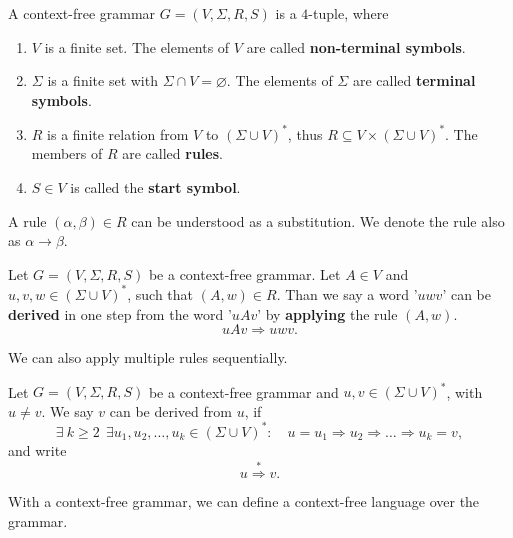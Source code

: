 \begin{definition}
A context-free grammar $G = (V, \Sigma, R, S)$ is a $4$-tuple, where
\begin{enumerate}
\item $V$ is a finite set. The elements of $V$ are called \textbf{non-terminal symbols}.
\item $\Sigma$ is a finite set with $\Sigma \cap V = \varnothing$. The elements of $\Sigma$ are called \textbf{terminal symbols}.
\item $R$ is a finite relation from $V$ to $(\Sigma \cup V)^\ast$, thus $R \subseteq V \times (\Sigma \cup V)^\ast$. The members of $R$ are called \textbf{rules}.
\item $S \in V$ is called the \textbf{start symbol}.
\end{enumerate}
\end{definition}

A rule $(\alpha,\beta) \in R$ can be understood as a substitution. We denote the rule also as $\alpha \longrightarrow \beta$.

\begin{definition}
Let $G = (V, \Sigma, R, S)$ be a context-free grammar. Let $A \in V$ and $u,v,w \in (\Sigma \cup V)^\ast$, such that $(A,w) \in R$. Than we say a word '$uwv$' can be \textbf{derived} in one step from the word '$uAv$' by \textbf{applying} the rule $(A,w)$.
\begin{equation}
uAv \Rightarrow uwv.
\end{equation}
\end{definition}

We can also apply multiple rules sequentially. 

\begin{definition}
Let $G = (V, \Sigma, R, S)$ be a context-free grammar and $u,v \in (\Sigma \cup V)^\ast$, with $u \neq v$. We say $v$ can be derived from $u$, if
\begin{equation}
\exists\ k \geq 2\ \ \exists u_1, u_2, \ldots, u_k \in (\Sigma \cup V)^\ast: \quad u = u_1 \Rightarrow u_2 \Rightarrow \ldots \Rightarrow u_k = v,
\end{equation}
and write
\begin{equation}
u \overset{\ast}{\Rightarrow} v.
\end{equation}
\end{definition}

With a context-free grammar, we can define a context-free language over the grammar.

